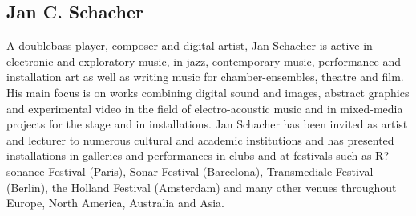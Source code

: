 \documentclass[a4paper]{article}
\begin{document}
\subsection*{Jan C. Schacher}
A doublebass-player, composer and digital artist, Jan Schacher is active in electronic and exploratory music, in jazz, contemporary music, performance and installation art as well as writing music for chamber-ensembles, theatre and film. His main focus is on works combining digital sound and images, abstract graphics and experimental video in the field of electro-acoustic music and in mixed-media projects for the stage and in installations. Jan Schacher has been invited as artist and lecturer to numerous cultural and academic institutions and has presented installations in galleries and performances in clubs and at festivals such as R?sonance Festival (Paris), Sonar Festival (Barcelona), Transmediale Festival (Berlin), the Holland Festival (Amsterdam) and many other venues throughout Europe, North America, Australia and Asia.
\end{document}
